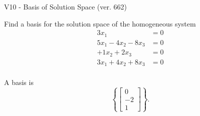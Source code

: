 \begin{exercise}
  \begin{exerciseTitle}V10 - Basis of Solution Space (ver. 662)\end{exerciseTitle}
  \begin{exerciseStatement}
    Find a basis for the solution space of the homogeneous system 
\begin{align*}
 3 x_ 1 &= 0  \\ 
  5 x_ 1 -4 x_ 2 -8 x_ 3 &= 0  \\ 
  + 1 x_ 2 + 2 x_ 3 &= 0  \\ 
  3 x_ 1 + 4 x_ 2 + 8 x_ 3 &= 0  \\ 
 \end{align*}


 
  \end{exerciseStatement}

  \begin{exerciseAnswer}
   A basis is   
\[\left\{\left[\begin{array}{c}
0 \\
-2 \\
1
\end{array}\right]\right\}.\]

  


  \end{exerciseAnswer}
\end{exercise}